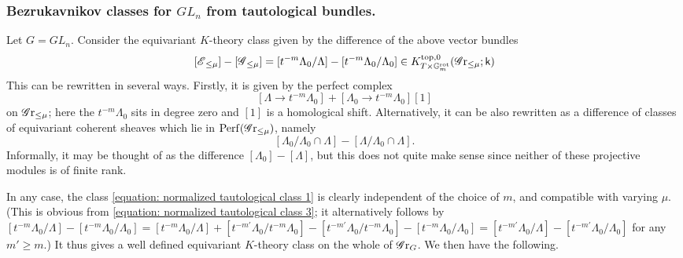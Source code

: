 \subsubsection{Bezrukavnikov classes for $GL_n$ from tautological bundles.}\label{section: bezrukavnikov classes for GL_n from tautological bundles}
Let $G=GL_n$. Consider the equivariant $K$-theory class given by the difference of the above vector bundles
\begin{equation}\label{equation: normalized tautological class 1}
[\operatorname{\mathscr{E}}_{\leq \mu}] - [\operatorname{\mathscr{G}}_{\leq \mu}] = [t^{-m}\Lambda_0 / \Lambda] - [t^{-m}\Lambda_0 / \Lambda_0] \in K^{\mathrm{top}, 0}_{T \times \mathbb{G}_m^{\mathrm{rot}}}(\operatorname{\mathscr{G}r}_{\leq \mu}; \mathsf{k})    
\end{equation}
This can be rewritten in several ways. Firstly, it is given by the perfect complex
\begin{equation}\label{equation: normalized tautological class 2}
[\Lambda \to t^{-m}\Lambda_0] + [\Lambda_0 \to t^{-m}\Lambda_0][1]
\end{equation}
on $\operatorname{\mathscr{G}r}_{\leq \mu}$; here the $t^{-m}\Lambda_0$ sits in degree zero and $[1]$ is a homological shift. 
%
Alternatively, it can be also rewritten as a difference of classes of equivariant coherent sheaves which lie in $\operatorname{Perf}(\operatorname{\mathscr{G}r}_{\leq \mu})$, namely
\begin{equation}\label{equation: normalized tautological class 3}
    [\Lambda_0 / \Lambda_0 \cap \Lambda] - [\Lambda / \Lambda_0 \cap \Lambda].
\end{equation}
Informally, it may be thought of as the difference $[\Lambda_0] - [\Lambda]$, but this does not quite make sense since neither of these projective modules is of finite rank.

In any case, the class \eqref{equation: normalized tautological class 1} is clearly independent of the choice of $m$, and compatible with varying $\mu$. (This is obvious from \eqref{equation: normalized tautological class 3}; it alternatively follows by $[t^{-m}\Lambda_0 / \Lambda] - [t^{-m}\Lambda_0 / \Lambda_0] = [t^{-m}\Lambda_0 / \Lambda] + [t^{-m'}\Lambda_0 / t^{-m}\Lambda_0 ] - [t^{-m'}\Lambda_0 / t^{-m}\Lambda_0 ] - [t^{-m}\Lambda_0 / \Lambda_0] = [t^{-m'}\Lambda_0 / \Lambda] - [t^{-m'}\Lambda_0 / \Lambda_0]$ for any $m' \geq m$.)  It thus gives a well defined equivariant $K$-theory class on the whole of $\operatorname{\mathscr{G}r}_G$. We then have the following.

